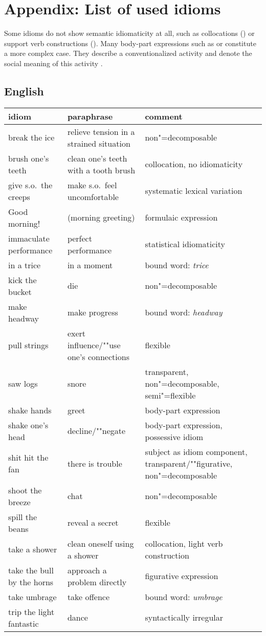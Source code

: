 \documentclass[output=paper
                ,modfonts
                ,nonflat
	        ,collection
	        ,collectionchapter
	        ,collectiontoclongg
 	        ,biblatex
                ,babelshorthands
                ,newtxmath
                ,draftmode
                ,colorlinks, citecolor=brown
]{./langsci/langscibook}
\begin{document}
\section*{Appendix: List of used idioms}

Some idioms do not show semantic idiomaticity at all, such as collocations () or support verb constructions (). 
Many body-part expressions such as  or  constitute a more complex case. They describe a conventionalized activity and denote the social meaning of this activity \citep{Burger:76}.

\subsection*{English}

\begin{tabular}{@{}lL{3.8cm}L{3.8cm}@{}}
idiom & paraphrase & comment\\\hline
break the ice      & relieve tension in a strained situation  & non"=decomposable\\
brush one's teeth  & clean one's teeth with a tooth brush     & collocation, no idiomaticity\\
give s.o.\ the creeps & make s.o.\ feel uncomfortable               & systematic lexical variation\\
Good morning!      & (morning greeting)                       & formulaic expression\\
immaculate performance & perfect performance & statistical idiomaticity\\
in a trice & in a moment & bound word: \emph{trice}\\
kick the bucket & die & non"=decomposable\\
make headway & make progress & bound word: \emph{headway}\\
pull strings & exert influence/""use one's connections & flexible\\
saw logs & snore & {transparent, non"=decomposable, semi"=flexible}\\
shake hands & greet & body-part expression\\
shake one's head & decline/""negate & {body-part expression, possessive idiom}\\
shit hit the fan & there is trouble & {subject as idiom component, transparent/""figurative, non"=decomposable}\\
shoot the breeze & chat & non"=decomposable\\
spill the beans & reveal a secret & flexible\\
take a shower & clean oneself using a shower & collocation, light verb construction\\
take the bull by the horns & {approach a problem directly} & figurative expression\\
take umbrage & take offence & bound word: \emph{umbrage}\\
trip the light fantastic & dance & syntactically irregular\\
\end{tabular}
\end{document}
